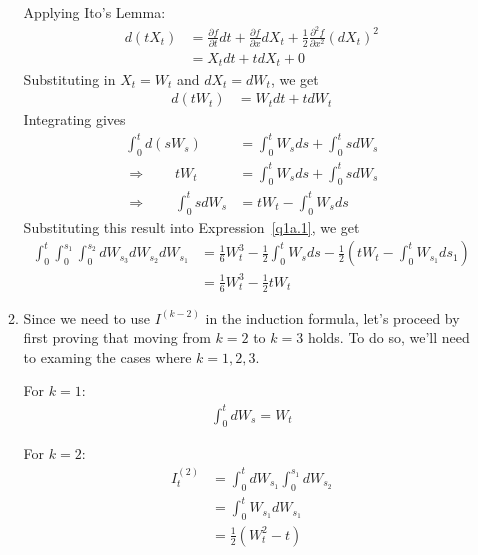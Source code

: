 \documentclass[12pt]{article}
\theoremstyle{plain}
\theoremstyle{definition}
\theoremstyle{remark}
\begin{document}
\begin{enumerate}
\begin{enumerate}
        Applying Ito's Lemma:
        \begin{align*}
          d\left(tX_t\right)
            &= \frac{\partial f}{\partial t} dt
              + \frac{\partial f}{\partial x} dX_t
              + \frac{1}{2} \frac{\partial^2 f}{\partial x^2} (dX_t)^2\\
            &= X_t dt + t dX_t + 0
        \end{align*}
        Substituting in $X_t = W_t$ and $dX_t = dW_t$, we get
        \begin{align*}
          d\left(tW_t\right) &= W_t dt + t dW_t
        \end{align*}
        Integrating gives
        \begin{align*}
          \int^t_0 d\left(sW_s\right) &= \int^t_0 W_s ds + \int^t_0 s dW_s\\
          \Rightarrow \qquad
          tW_t &= \int^t_0 W_s ds + \int^t_0 s dW_s\\
          \Rightarrow \qquad
          \int^t_0 s dW_s &=
            tW_t - \int^t_0 W_s ds
        \end{align*}
        Substituting this result into Expression~\ref{q1a.1}, we get
        \begin{align*}
          \int^t_0 \int_0^{s_1} \int_0^{s_2} dW_{s_3}dW_{s_2}dW_{s_1}
          &= \frac{1}{6}W_t^3 - \frac{1}{2}\int^t_0 W_s ds
            -\frac{1}{2} \left(
              tW_t - \int^t_0 W_{s_1} ds_1
            \right) \\
          &= \frac{1}{6}W_t^3 -\frac{1}{2} tW_t
        \end{align*}

      \item %
        Since we need to use $I^{(k-2)}$ in the induction formula, let's
        proceed by first proving that moving from $k=2$ to $k=3$ holds.
        To do so, we'll need to examing the cases where $k=1,2,3$.

        For $k=1$:
        \begin{align*}
          \int^t_0 dW_s = W_t
        \end{align*}

        For $k=2$:
        \begin{align*} I^{(2)}_t
          &= \int^t_0 dW_{s_1} \int^{s_1}_0 dW_{s_2}\\
          &= \int^t_0 W_{s_1} dW_{s_1} \\
          &= \frac{1}{2}(W_t^2 - t)
        \end{align*}


\end{enumerate}
\end{enumerate}
\end{document}
